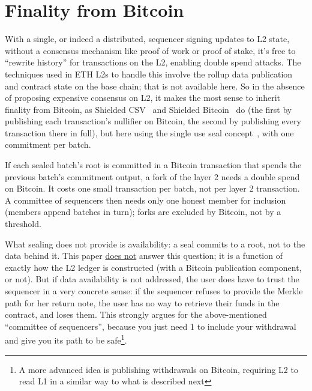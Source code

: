 \documentclass[11pt]{article}
\begin{document}
\section{Finality from Bitcoin}
\label{sec:finality}

With a single, or indeed a distributed, sequencer signing updates to L2 state, without a consensus mechanism like proof of work or proof of stake, it's free to ``rewrite history'' for transactions on the L2, enabling double spend attacks. The techniques used in ETH L2s to handle this involve the rollup data publication and contract state on the base chain; that is not available here. So in the absence of proposing expensive consensus on L2, it makes the most sense to inherit finality from Bitcoin, as Shielded CSV~\cite{shieldedcsv} and Shielded Bitcoin~\cite{shieldedbtc} do (the first by publishing each transaction's nullifier on Bitcoin, the second by publishing every transaction there in full), but here using the single use seal concept~\cite{toddseals}, with one commitment per batch.

If each sealed batch's root is committed in a Bitcoin transaction that spends the previous batch's commitment output, a fork of the layer 2 needs a double spend on Bitcoin. It costs one small transaction per batch, not per layer 2 transaction. A committee of sequencers then needs only one honest member for inclusion (members append batches in turn); forks are excluded by Bitcoin, not by a threshold.

What sealing does not provide is availability: a seal commits to a root, not to the data behind it. This paper \underline{does not} answer this question; it is a function of exactly how the L2 ledger is constructed (with a Bitcoin publication component, or not). But if data availability is not addressed, the user does have to trust the sequencer in a very concrete sense: if the sequencer refuses to provide the Merkle path for her return note, the user has no way to retrieve their funds in the contract, and loses them. This strongly argues for the above-mentioned ``committee of sequencers'', because you just need 1 to include your withdrawal and give you its path to be safe\footnote{A more advanced idea is publishing withdrawals on Bitcoin, requiring L2 to read L1 in a similar way to what is described next}.
\end{document}
